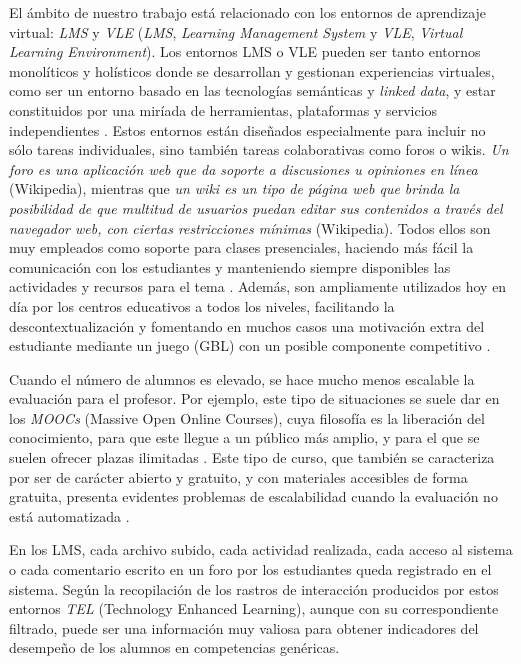 El ámbito de nuestro trabajo está relacionado con los entornos de aprendizaje virtual: \emph{LMS} y \emph{VLE} (\emph{LMS}, \emph{Learning Management System} y \emph{VLE}, \emph{Virtual Learning Environment}). Los entornos LMS o VLE pueden ser tanto entornos monolíticos y holísticos donde se desarrollan y gestionan experiencias virtuales, como ser un entorno basado en las tecnologías semánticas y \emph{linked data}, y estar constituidos por una miríada de herramientas, plataformas y servicios independientes \cite{Dodero:2013}. Estos entornos están diseñados especialmente para incluir no sólo tareas individuales, sino también tareas colaborativas como foros o wikis. \emph{Un foro es una aplicación web que da soporte a discusiones u opiniones en línea} (Wikipedia), mientras que \emph{un wiki es un tipo de página web que brinda la posibilidad de que multitud de usuarios puedan editar sus contenidos a través del navegador web, con ciertas restricciones mínimas} (Wikipedia). Todos ellos son muy empleados como soporte para clases presenciales, haciendo más fácil la comunicación con los estudiantes y manteniendo siempre disponibles las actividades y recursos para el tema \cite{Zafra:2011, Munkhchimeg:2013}. Además, son ampliamente utilizados hoy en día por los centros educativos a todos los niveles, facilitando la descontextualización y fomentando en muchos casos una motivación extra del estudiante mediante un juego (GBL) con un posible componente competitivo \cite{Bellotti:2013,Berns:2013,Palomo-Duarte:2012}.

Cuando el número de alumnos es elevado, se hace mucho menos escalable la evaluación para el profesor. Por ejemplo, este tipo de situaciones se suele dar en los \emph{MOOCs} (Massive Open Online Courses), cuya filosofía es la liberación del conocimiento, para que este llegue a un público más amplio, y para el que se suelen ofrecer plazas ilimitadas \cite{Lugton:2012, Mor:2013}. Este tipo de curso, que también se caracteriza por ser de carácter abierto y gratuito, y con materiales accesibles de forma gratuita, presenta evidentes problemas de escalabilidad cuando la evaluación no está automatizada \cite{Johnson:2013}.

En los LMS, cada archivo subido, cada actividad realizada, cada acceso al sistema o cada comentario escrito en un foro por los estudiantes queda registrado en el sistema. Según \cite{Chebil:2012, Florian:2011} la recopilación de los rastros de interacción producidos por estos entornos \emph{TEL} (Technology Enhanced Learning), aunque con su correspondiente filtrado, puede ser una información muy valiosa para obtener indicadores del desempeño de los alumnos en competencias genéricas.


